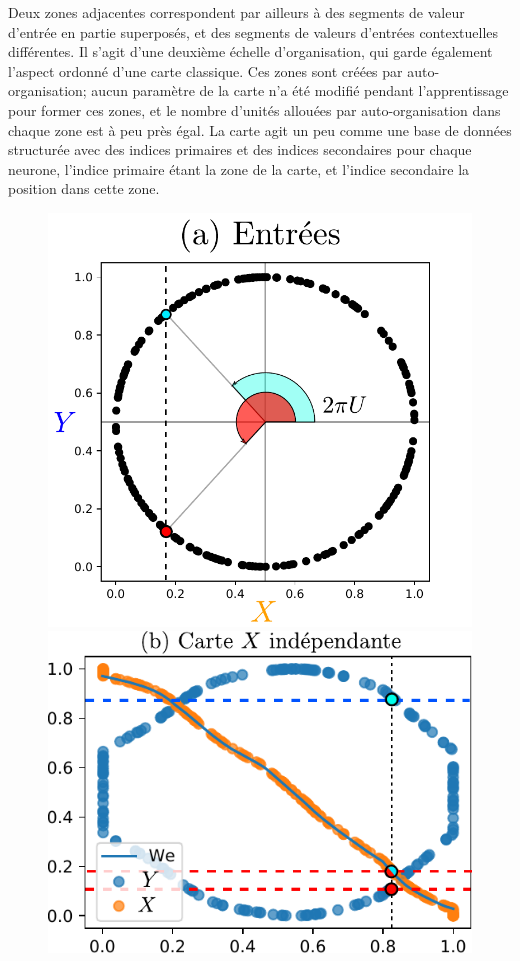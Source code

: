 Deux zones adjacentes correspondent par ailleurs à des segments de valeur d'entrée en partie superposés, et des segments de valeurs d'entrées contextuelles différentes. Il s'agit d'une deuxième échelle d'organisation, qui garde également l'aspect ordonné d'une carte classique. Ces zones sont créées par auto-organisation; aucun paramètre de la carte n'a été modifié pendant l'apprentissage pour former ces zones, et le nombre d'unités allouées par auto-organisation dans chaque zone est à peu près égal. La carte agit un peu comme une base de données structurée avec des indices primaires et des indices secondaires pour chaque neurone, l'indice primaire étant la zone de la carte, et l'indice secondaire la position dans cette zone.

\begin{figure}
\begin{minipage}{0.27\textwidth}
\includegraphics[width=\textwidth]{2som_inp.pdf}
\end{minipage}
\begin{minipage}{0.34\textwidth}
\includegraphics[width=\textwidth]{weights_2som_unco.pdf}

\end{minipage}
\end{figure}
